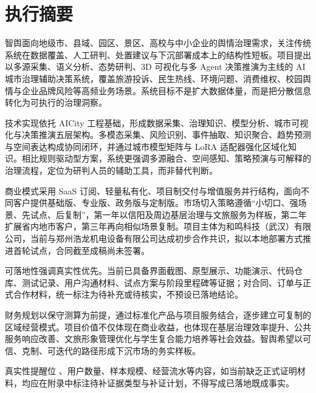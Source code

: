 \chapter*{执行摘要}

智舆面向地级市、县域、园区、景区、高校与中小企业的舆情治理需求，关注传统系统在数据覆盖、人工研判、处置建议与下沉部署成本上的结构性短板。项目提出以多源采集、语义分析、态势研判、3D 可视化与多 Agent 决策推演为主线的 AI 城市治理辅助决策系统，覆盖旅游投诉、民生热线、环境问题、消费维权、校园舆情与企业品牌风险等高频业务场景。系统目标不是扩大数据体量，而是把分散信息转化为可执行的治理洞察。

技术实现依托 AICity 工程基础，形成数据采集、治理知识、模型分析、城市可视化与决策推演五层架构。多模态采集、风险识别、事件抽取、知识聚合、趋势预测与空间表达构成协同闭环，并通过城市模型矩阵与 LoRA 适配器强化区域化知识。相比规则驱动型方案，系统更强调多源融合、空间感知、策略预演与可解释的治理流程，定位为研判人员的辅助工具，而非替代判断。

商业模式采用 SaaS 订阅、轻量私有化、项目制交付与增值服务并行结构，面向不同客户提供基础版、专业版、政务版与定制版。市场切入策略遵循“小切口、强场景、先试点、后复制”，第一年以信阳及周边基层治理与文旅服务为样板，第二年扩展省内地市客户，第三年再向相似场景复制。项目主体为和鸣科技（武汉）有限公司，当前与郑州浩龙机电设备有限公司达成初步合作共识，拟以本地部署方式推进首轮试点，合同截至成稿尚未签署。

可落地性强调真实性优先。当前已具备界面截图、原型展示、功能演示、代码仓库、测试记录、用户沟通材料、试点方案与阶段里程碑等证据；对合同、订单与正式合作材料，统一标注为待补充或待核实，不预设已落地结论。

财务规划以保守测算为前提，通过标准化产品与项目服务结合，逐步建立可复制的区域经营模式。项目价值不仅体现在商业收益，也体现在基层治理效率提升、公共服务响应改善、文旅形象管理优化与学生复合能力培养等社会效益。智舆希望以可信、克制、可迭代的路径形成下沉市场的务实样板。

\begin{infobox}{真实性提醒位}
	、用户数量、样本规模、经营流水等内容，如当前缺乏正式证明材料，均应在附录中标注待补证据类型与补证计划，不得写成已落地既成事实。
\end{infobox}
